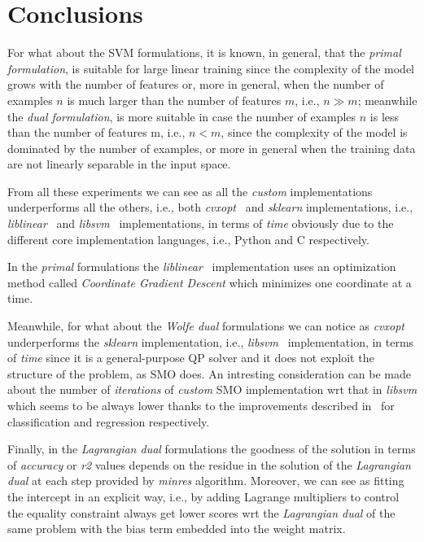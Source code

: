 \section{Conclusions}

For what about the SVM formulations, it is known, in general, that the \emph{primal formulation}, is suitable for large linear training since the complexity of the model grows with the number of features or, more in general, when the number of examples $n$ is much larger than the number of features $m$, i.e., $n \gg m$; meanwhile the \emph{dual formulation}, is more suitable in case the number of examples $n$ is less than the number of features m, i.e., $n < m$, since the complexity of the model is dominated by the number of examples, or more in general when the training data are not linearly separable in the input space.

\bigskip

From all these experiments we can see as all the \emph{custom} implementations underperforms all the others, i.e., both \emph{cvxopt}~\cite{vandenberghe2010cvxopt} and \emph{sklearn} implementations, i.e., \emph{liblinear}~\cite{fan2008liblinear} and \emph{libsvm}~\cite{chang2011libsvm} implementations, in terms of \emph{time} obviously due to the different core implementation languages, i.e., Python and C respectively.

In the \emph{primal} formulations the \emph{liblinear}~\cite{fan2008liblinear} implementation uses an optimization method called \emph{Coordinate Gradient Descent} which minimizes one coordinate at a time.

Meanwhile, for what about the \emph{Wolfe dual} formulations we can notice as \emph{cvxopt}~\cite{vandenberghe2010cvxopt} underperforms the \emph{sklearn} implementation, i.e., \emph{libsvm}~\cite{chang2011libsvm} implementation, in terms of \emph{time} since it is a general-purpose QP solver and it does not exploit the structure of the problem, as SMO does. An intresting consideration can be made about the number of \emph{iterations} of \emph{custom} SMO implementation wrt that in \emph{libsvm} which seems to be always lower thanks to the improvements described in~\cite{keerthi2001improvements, shevade1999improvements} for classification and regression respectively.

Finally, in the \emph{Lagrangian dual} formulations the goodness of the solution in terms of \emph{accuracy} or \emph{r2} values depends on the residue in the solution of the \emph{Lagrangian dual} at each step provided by \emph{minres} algorithm. Moreover, we can see as fitting the intercept in an explicit way, i.e., by adding Lagrange multipliers to control the equality constraint always get lower scores wrt the \emph{Lagrangian dual} of the same problem with the bias term embedded into the weight matrix.

